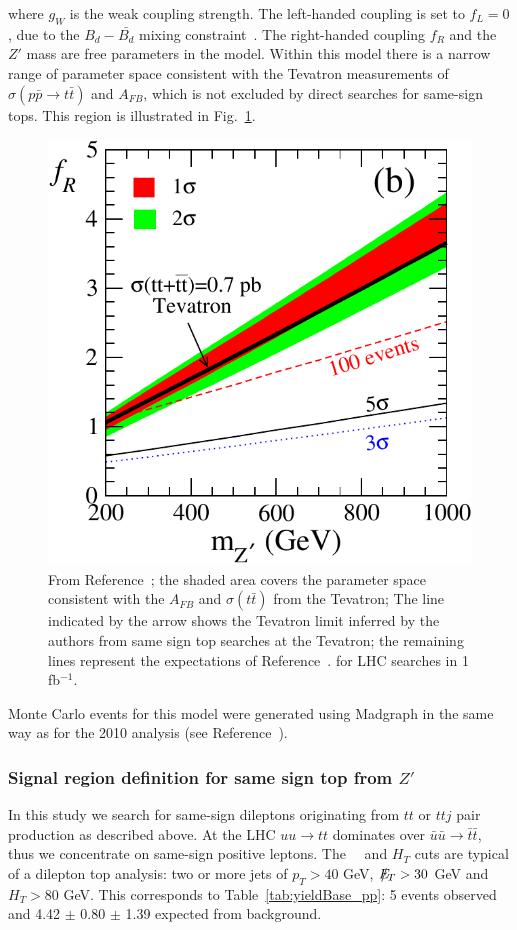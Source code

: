 where $g_W$ is the weak coupling strength. The left-handed coupling is set to $f_L = 0$, due 
to the $B_d-\bar{B_d}$ mixing constraint~\cite{Cao}. 
The right-handed coupling $f_R$ and the $Z'$ mass are free parameters in the model.
Within this model there is a narrow range of parameter space
consistent with the Tevatron measurements of $\sigma(p\bar{p} \to t\bar{t})$ 
and $A_{FB}$, which is not excluded by direct searches for same-sign tops.
This region is illustrated in Fig.~\ref{fig:berger_limit}.


\begin{figure}[htb]
\begin{center}
\includegraphics[width=0.4\linewidth]{figs/berger_limit.pdf}
\caption{\protect From Reference~\cite{fcnczprime}; the shaded area covers the parameter
space consistent with the $A_{FB}$ and $\sigma(t\bar{t})$ from the Tevatron;
The line indicated by the arrow shows the Tevatron limit inferred by the authors
from same sign top searches at the Tevatron; the remaining lines represent the
expectations of Reference~\cite{fcnczprime}.
for LHC searches in 1 fb$^{-1}$. \label{fig:berger_limit}}
\end{center}
\end{figure}

Monte Carlo events for this model were generated using Madgraph in the same way as 
for the 2010 analysis (see Reference~\cite{ttAN}).



\subsubsection{Signal region definition for same sign top from $Z'$}
\label{sec:sstopsigdefinition}
In this study we search for same-sign dileptons originating from $tt$ 
or $ttj$ pair production as described above.  At the LHC $uu \to tt$ 
dominates over $\bar{u}\bar{u} \to \bar{t}\bar{t}$, thus we concentrate
on same-sign positive leptons.  The \met~~and $H_T$ cuts are typical 
of a dilepton top analysis: two or more jets of $p_T>40$ GeV, 
$E\!\!\!\!/_T > 30$ GeV and $H_T > 80$ GeV.  This corresponds to Table~\ref{tab:yieldBase_pp}:
5 events observed and 4.42 $\pm$ 0.80 $\pm$ 1.39 expected from background.

